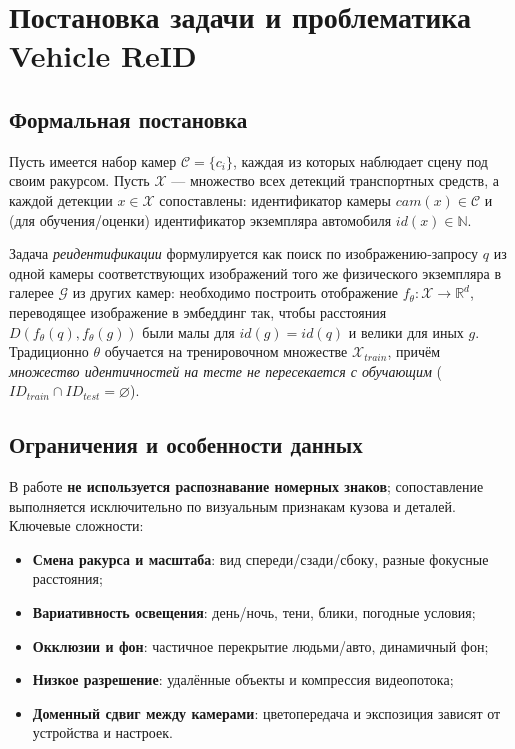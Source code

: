 {\huge\chapter{Постановка задачи и проблематика Vehicle ReID}}
\label{sec:Chapter1} 

\section{Формальная постановка}
Пусть имеется набор камер \(\mathcal{C}=\{c_i\}\), каждая из которых наблюдает сцену под своим ракурсом. Пусть \(\mathcal{X}\) — множество всех детекций транспортных средств, а каждой детекции \(x \in \mathcal{X}\) сопоставлены: идентификатор камеры \(cam(x)\in\mathcal{C}\) и (для обучения/оценки) идентификатор экземпляра автомобиля \(id(x)\in\mathbb{N}\).

Задача \emph{реидентификации} формулируется как поиск по изображению‑запросу \(q\) из одной камеры соответствующих изображений того же физического экземпляра в галерее \(\mathcal{G}\) из других камер: необходимо построить отображение \(f_\theta: \mathcal{X}\rightarrow\mathbb{R}^d\), переводящее изображение в эмбеддинг так, чтобы расстояния \(D(f_\theta(q), f_\theta(g))\) были малы для \(id(g)=id(q)\) и велики для иных \(g\). Традиционно \(\theta\) обучается на тренировочном множестве \(\mathcal{X}_{train}\), причём \emph{множество идентичностей на тесте не пересекается с обучающим} (\(ID_{train}\cap ID_{test}=\varnothing\)).

\section{Ограничения и особенности данных}
В работе \textbf{не используется распознавание номерных знаков}; сопоставление выполняется исключительно по визуальным признакам кузова и деталей. Ключевые сложности:
\begin{itemize}
  \item \textbf{Смена ракурса и масштаба}: вид спереди/сзади/сбоку, разные фокусные расстояния;
  \item \textbf{Вариативность освещения}: день/ночь, тени, блики, погодные условия;
  \item \textbf{Окклюзии и фон}: частичное перекрытие людьми/авто, динамичный фон;
  \item \textbf{Низкое разрешение}: удалённые объекты и компрессия видеопотока;
  \item \textbf{Доменный сдвиг между камерами}: цветопередача и экспозиция зависят от устройства и настроек.
\end{itemize}

